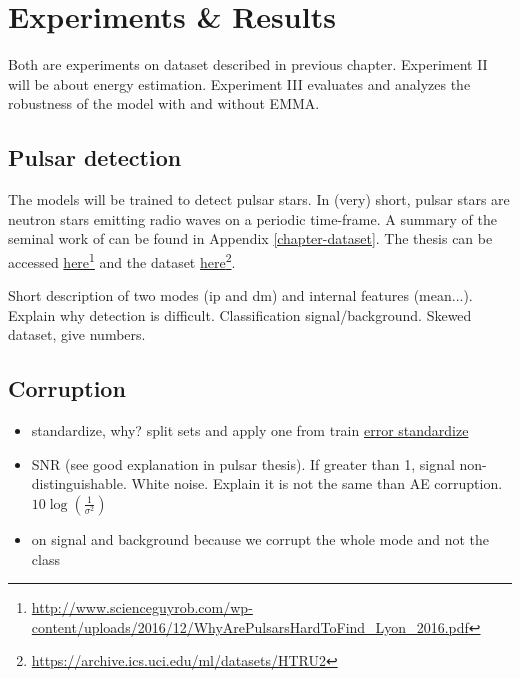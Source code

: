 \chapter{Experiments \& Results} 
\label{chapter-experiments} 

Both are experiments on dataset described in previous chapter. Experiment II will be about energy estimation. Experiment III evaluates and analyzes the robustness of the model with and without EMMA.



\section{Pulsar detection}
The models will be trained to detect pulsar stars. In (very) short, pulsar stars are neutron stars emitting radio waves on a periodic time-frame. A summary of the seminal work of \citep{lyon} can be found in Appendix \ref{chapter-dataset}. The thesis can be accessed \href{http://www.scienceguyrob.com/wp-content/uploads/2016/12/WhyArePulsarsHardToFind_Lyon_2016.pdf}{here}\footnote{\url{http://www.scienceguyrob.com/wp-content/uploads/2016/12/WhyArePulsarsHardToFind_Lyon_2016.pdf}} and the dataset \href{https://archive.ics.uci.edu/ml/datasets/HTRU2}{here}\footnote{\url{https://archive.ics.uci.edu/ml/datasets/HTRU2}}.

Short description of two modes (ip and dm) and internal features (mean...).  Explain why detection is difficult. Classification signal/background. Skewed dataset, give numbers.


\section{Corruption}
\begin{itemize}
\item standardize, why? split sets and apply one from train \href{https://stats.stackexchange.com/questions/327294/data-standardization-for-training-and-testing-sets-for-different-scenarios}{error standardize}
\item SNR (see good explanation in pulsar thesis). If greater than 1, signal non-distinguishable. White noise. Explain it is not the same than AE corruption. $ 10\log(\frac{1}{\sigma^2})$
\item on signal and background because we corrupt the whole mode and not the class
\end{itemize}


